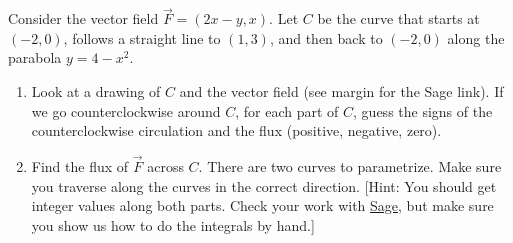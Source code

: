\begin{problem}%
%
 Consider the vector field $\vec F=(2x-y,x)$. Let $C$ be the curve that starts at $(-2,0)$, follows a straight line to $(1,3)$, and then back to $(-2,0)$ along the parabola $y=4-x^2$.  

\begin{enumerate}
\item Look at a drawing of $C$ and the vector field (see margin for the Sage link).  If we go counterclockwise around $C$, for each part of $C$, guess the signs of the counterclockwise circulation and the flux (positive, negative, zero).
\item Find the flux of $\vec F$ across $C$.  There are two curves to parametrize. Make sure you traverse along the curves in the correct direction. [Hint: You should get integer values along both parts. Check your work with \href{\sageworkfluxurl}{Sage}, but make sure you show us how to do the integrals by hand.]
\end{enumerate}
\end{problem}

